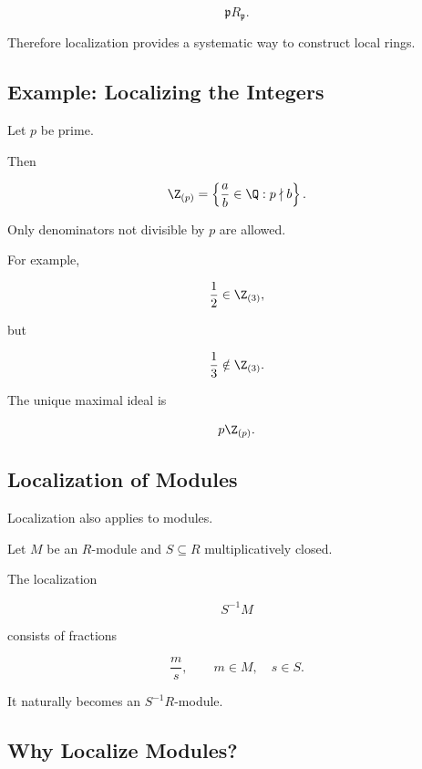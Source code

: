 \[ \mathfrak pR_{\mathfrak p}. \]

Therefore localization provides a systematic way to construct local rings.

\subsection{Example: Localizing the Integers}
\label{subsec:localizing-integers-prime}

Let \(p\) be prime.

Then

\[ \Z_{(p)}=\left\{\frac{a}{b}\in\Q:p\nmid b\right\}. \]

Only denominators not divisible by \(p\) are allowed.

For example,

\[ \frac{1}{2}\in\Z_{(3)}, \]

but

\[ \frac{1}{3}\notin\Z_{(3)}. \]

The unique maximal ideal is

\[ p\Z_{(p)}. \]

\subsection{Localization of Modules}
\label{subsec:localization-modules}

Localization also applies to modules.

Let \(M\) be an \(R\)-module and \(S\subseteq R\) multiplicatively closed.

The localization

\[ S^{-1}M \]

consists of fractions

\[ \frac{m}{s},\qquad m\in M,\quad s\in S. \]

It naturally becomes an \(S^{-1}R\)-module.

\subsection{Why Localize Modules?}
\label{subsec:why-localize-modules}


